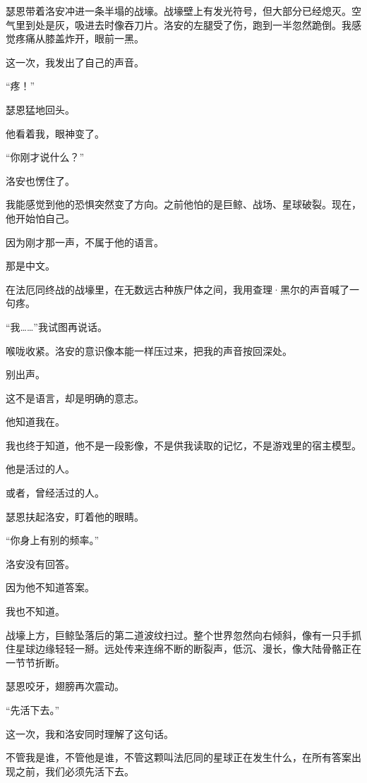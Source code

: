 瑟恩带着洛安冲进一条半塌的战壕。战壕壁上有发光符号，但大部分已经熄灭。空气里到处是灰，吸进去时像吞刀片。洛安的左腿受了伤，跑到一半忽然跪倒。我感觉疼痛从膝盖炸开，眼前一黑。

这一次，我发出了自己的声音。

“疼！”

瑟恩猛地回头。

他看着我，眼神变了。

“你刚才说什么？”

洛安也愣住了。

我能感觉到他的恐惧突然变了方向。之前他怕的是巨鲸、战场、星球破裂。现在，他开始怕自己。

因为刚才那一声，不属于他的语言。

那是中文。

在法厄同终战的战壕里，在无数远古种族尸体之间，我用查理·黑尔的声音喊了一句疼。

“我……”我试图再说话。

喉咙收紧。洛安的意识像本能一样压过来，把我的声音按回深处。

别出声。

这不是语言，却是明确的意志。

他知道我在。

我也终于知道，他不是一段影像，不是供我读取的记忆，不是游戏里的宿主模型。

他是活过的人。

或者，曾经活过的人。

瑟恩扶起洛安，盯着他的眼睛。

“你身上有别的频率。”

洛安没有回答。

因为他不知道答案。

我也不知道。

战壕上方，巨鲸坠落后的第二道波纹扫过。整个世界忽然向右倾斜，像有一只手抓住星球边缘轻轻一掰。远处传来连绵不断的断裂声，低沉、漫长，像大陆骨骼正在一节节折断。

瑟恩咬牙，翅膀再次震动。

“先活下去。”

这一次，我和洛安同时理解了这句话。

不管我是谁，不管他是谁，不管这颗叫法厄同的星球正在发生什么，在所有答案出现之前，我们必须先活下去。
